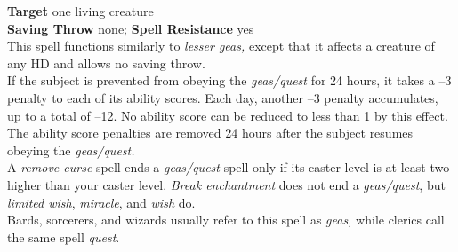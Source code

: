 \textbf{Target }one living creature\\
\textbf{Saving Throw} none; \textbf{Spell Resistance }yes\\
This spell functions similarly to \textit{lesser geas, }except that it affects a creature of any HD and allows no saving throw.\\
If the subject is prevented from obeying the \textit{geas/quest }for 24 hours, it takes a --3 penalty to each of its ability scores. Each day, another --3 penalty accumulates, up to a total of --12. No ability score can be reduced to less than 1 by this effect. The ability score penalties are removed 24 hours after the subject resumes obeying the \textit{geas/quest.}\\
A \textit{remove curse }spell ends a \textit{geas/quest }spell only if its caster level is at least two higher than your caster level. \textit{Break enchantment }does not end a \textit{geas/quest}, but \textit{limited wish}, \textit{miracle}, and \textit{wish }do.\\
Bards, sorcerers, and wizards usually refer to this spell as \textit{geas, }while clerics call the same spell \textit{quest}.\\
